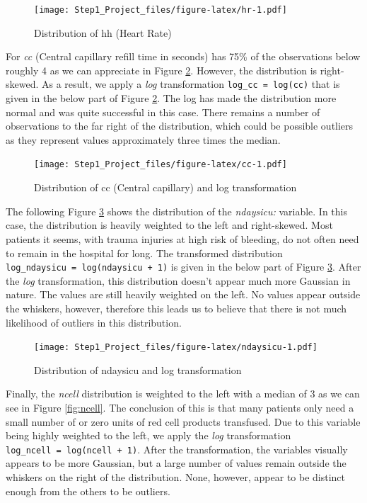 \documentclass[
]{article}
\begin{document}
\begin{figure}
\centering
\texttt{[image: Step1\_Project\_files/figure-latex/hr-1.pdf]}
\caption{Distribution of hh (Heart Rate)\label{fig:hr}}
\end{figure}

For \emph{cc} (Central capillary refill time in seconds) has 75\% of the
observations below roughly 4 as we can appreciate in Figure
\ref{fig:cc}. However, the distribution is right-skewed. As a result, we
apply a \emph{log} transformation \texttt{log\_cc\ =\ log(cc)} that is
given in the below part of Figure \ref{fig:cc}. The log has made the
distribution more normal and was quite successful in this case. There
remains a number of observations to the far right of the distribution,
which could be possible outliers as they represent values approximately
three times the median.

\begin{figure}
\centering
\texttt{[image: Step1\_Project\_files/figure-latex/cc-1.pdf]}
\caption{Distribution of cc (Central capillary) and log
transformation\label{fig:cc}}
\end{figure}

The following Figure \ref{fig:ndaysicu} shows the distribution of the
\emph{ndaysicu:} variable. In this case, the distribution is heavily
weighted to the left and right-skewed. Most patients it seems, with
trauma injuries at high risk of bleeding, do not often need to remain in
the hospital for long. The transformed distribution
\texttt{log\_ndaysicu\ =\ log(ndaysicu\ +\ 1)} is given in the below
part of Figure \ref{fig:ndaysicu}. After the \emph{log} transformation,
this distribution doesn't appear much more Gaussian in nature. The
values are still heavily weighted on the left. No values appear outside
the whiskers, however, therefore this leads us to believe that there is
not much likelihood of outliers in this distribution.

\begin{figure}
\centering
\texttt{[image: Step1\_Project\_files/figure-latex/ndaysicu-1.pdf]}
\caption{Distribution of ndaysicu and log
transformation\label{fig:ndaysicu}}
\end{figure}

Finally, the \emph{ncell} distribution is weighted to the left with a
median of 3 as we can see in Figure \ref{fig:ncell}. The conclusion of
this is that many patients only need a small number of or zero units of
red cell products transfused. Due to this variable being highly weighted
to the left, we apply the \emph{log} transformation
\texttt{log\_ncell\ =\ log(ncell\ +\ 1)}. After the transformation, the
variables visually appears to be more Gaussian, but a large number of
values remain outside the whiskers on the right of the distribution.
None, however, appear to be distinct enough from the others to be
outliers.
\end{document}
